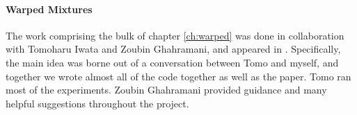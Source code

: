 \paragraph{Warped Mixtures}
The work comprising the bulk of chapter \ref{ch:warped} was done in collaboration with Tomoharu Iwata and Zoubin Ghahramani, and appeared in \citep{IwaDuvGha12}.
Specifically, the main idea was borne out of a conversation between Tomo and myself, and together we wrote almost all of the code together as well as the paper.
Tomo ran most of the experiments.
Zoubin Ghahramani provided guidance and many helpful suggestions throughout the project.



\outbpdocument{


}


